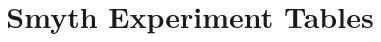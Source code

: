 \documentclass[acmsmall,nonacm]{acmart}
\begin{document}
\title{Smyth Experiment Tables}
\maketitle

\setcounter{figure}{9}

\setcounter{figure}{0}




\end{document}
